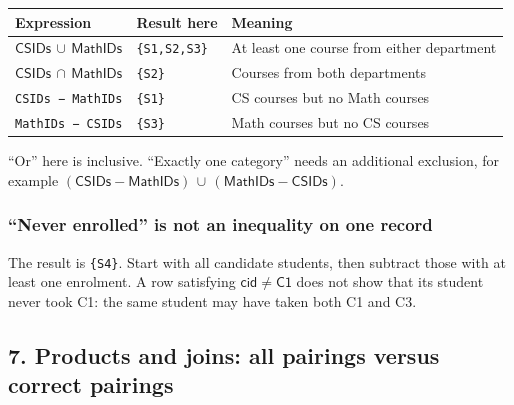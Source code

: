 \begin{longtable}[]{@{}
  >{\raggedright\arraybackslash}p{}
  >{\raggedright\arraybackslash}p{}
  >{\raggedright\arraybackslash}p{}@{}}
\toprule\noalign{}
\begin{minipage}[b]{\linewidth}\raggedright
Expression
\end{minipage} & \begin{minipage}[b]{\linewidth}\raggedright
Result here
\end{minipage} & \begin{minipage}[b]{\linewidth}\raggedright
Meaning
\end{minipage} \\
\midrule\noalign{}
\endhead
\bottomrule\noalign{}
\endlastfoot
\(\mathsf{CSIDs}\,\cup \,\mathsf{MathIDs}\) & \texttt{\{S1,S2,S3\}} & At least one course from either department \\
\(\mathsf{CSIDs}\,\cap \,\mathsf{MathIDs}\) & \texttt{\{S2\}} & Courses from both departments \\
\texttt{CSIDs\ −\ MathIDs} & \texttt{\{S1\}} & CS courses but no Math courses \\
\texttt{MathIDs\ −\ CSIDs} & \texttt{\{S3\}} & Math courses but no CS courses \\
\end{longtable}

``Or'' here is inclusive. ``Exactly one category'' needs an additional exclusion, for example \((\mathsf{CSIDs}- \mathsf{MathIDs})\,\cup \,(\mathsf{MathIDs}- \mathsf{CSIDs})\).

\subsubsection{``Never enrolled'' is not an inequality on one record}\label{05_relational_algebra_en-never-enrolled-is-not-an-inequality-on-one-record}


The result is \texttt{\{S4\}}. Start with all candidate students, then subtract those with at least one enrolment. A row satisfying \(\mathsf{cid}\ne \mathsf{C1}\) does not show that its student never took C1: the same student may have taken both C1 and C3.

\subsection{7. Products and joins: all pairings versus correct pairings}\label{05_relational_algebra_en-products-and-joins-all-pairings-versus-correct-pairings}

